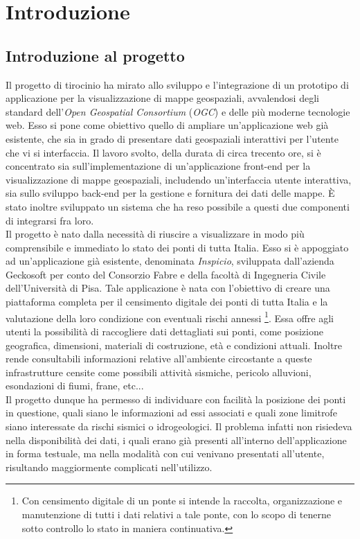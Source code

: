 \chapter{Introduzione}

\section{Introduzione al progetto}

Il progetto di tirocinio ha mirato allo sviluppo e l'integrazione di un prototipo di applicazione per la visualizzazione di mappe geospaziali, avvalendosi degli standard dell'\textit{Open Geospatial Consortium} (\textit{OGC}) e delle più moderne tecnologie web. Esso si pone come obiettivo quello di ampliare un’applicazione web già esistente, che sia in grado di presentare dati geospaziali interattivi per l’utente che vi si interfaccia. Il lavoro svolto, della durata di circa trecento ore, si è concentrato sia sull'implementazione di un'applicazione front-end per la visualizzazione di mappe geospaziali, includendo un'interfaccia utente interattiva, sia sullo sviluppo back-end per la gestione e fornitura dei dati delle mappe. È  stato inoltre sviluppato un sistema che ha reso possibile a questi due componenti di integrarsi fra loro. 
\\Il progetto è nato dalla necessità di riuscire a visualizzare in modo più comprensibile e immediato lo stato dei ponti di tutta Italia. Esso si è appoggiato ad un'applicazione già esistente, denominata \textit{Inspicio}, sviluppata dall'azienda Geckosoft per conto del Consorzio Fabre e della facoltà di Ingegneria Civile dell'Università di Pisa. Tale applicazione è nata con l’obiettivo di creare una piattaforma completa per il censimento digitale dei ponti di tutta Italia e la valutazione della loro condizione con eventuali rischi annessi
\footnote[1]{Con censimento digitale di un ponte si intende la raccolta, organizzazione e manutenzione di tutti i dati relativi a tale ponte, con lo scopo di tenerne sotto controllo lo stato in maniera continuativa.}. 
Essa offre agli utenti la possibilità di raccogliere dati dettagliati sui ponti, come posizione geografica, dimensioni, materiali di costruzione, età e condizioni attuali. Inoltre rende consultabili informazioni relative all'ambiente circostante a queste infrastrutture censite come possibili attività sismiche, pericolo alluvioni, esondazioni di fiumi, frane, etc...
\\Il progetto dunque ha permesso di individuare con facilità la posizione dei ponti in questione, quali siano le informazioni ad essi associati e quali zone limitrofe siano interessate da rischi sismici o idrogeologici. Il problema infatti non risiedeva nella disponibilità dei dati, i quali erano già presenti all'interno dell'applicazione in forma testuale, ma nella modalità con cui venivano presentati all'utente, risultando maggiormente complicati nell'utilizzo.

